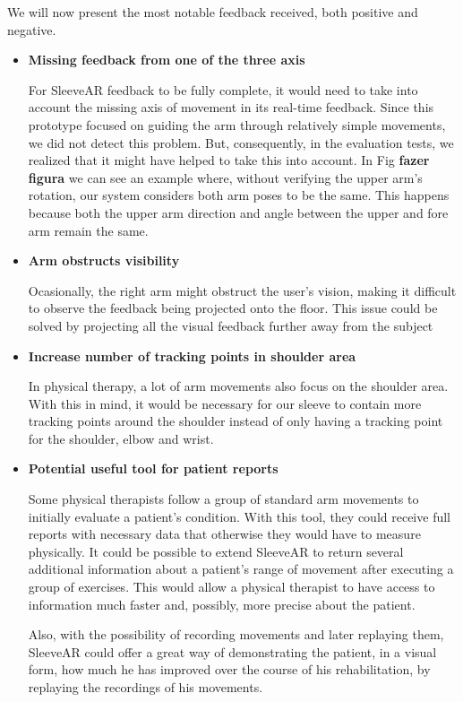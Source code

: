 We will now present the most notable feedback received, both positive and negative.




\begin{itemize}
\item \textbf{Missing feedback from one of the three axis}

For SleeveAR feedback to be fully complete, it would need to take into account the missing axis of movement in its real-time feedback. Since this prototype focused on guiding the arm through relatively simple movements, we did not detect this problem. But, consequently, in the evaluation tests, we realized that it might have helped to take this into account. In Fig \textbf{fazer figura} we can see an example where, without verifying the upper arm's rotation, our system considers both arm poses to be the same. This happens because both the upper arm direction and angle between the upper and fore arm remain the same.


\item \textbf{Arm obstructs visibility}

Ocasionally, the right arm might obstruct the user's vision, making it difficult to observe the feedback being projected onto the floor. This issue could be solved by projecting all the visual feedback further away from the subject

\item \textbf{Increase number of tracking points in shoulder area}

In physical therapy, a lot of arm movements also focus on the shoulder area. With this in mind, it would be necessary for our sleeve to contain more tracking points around the shoulder instead of only having a tracking point for the shoulder, elbow and wrist.

\item \textbf{Potential useful tool for patient reports}

Some physical therapists follow a group of standard arm movements to initially evaluate a patient's condition. With this tool, they could receive full reports with necessary data that otherwise they would have to measure physically. It could be possible to extend SleeveAR to return several additional information about a patient's range of movement after executing a group of exercises. This would allow a physical therapist to have access to information much faster and, possibly, more precise about the patient. 

Also, with the possibility of recording movements and later replaying them, SleeveAR could offer a great way of demonstrating the patient, in a visual form, how much he has improved over the course of his rehabilitation, by replaying the recordings of his movements.


\end{itemize}
